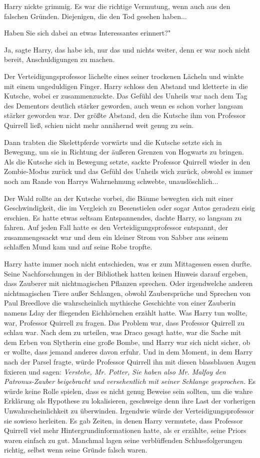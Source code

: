 Harry nickte grimmig. Es war die richtige Vermutung, wenn auch aus den falschen
Gründen. Diejenigen, die den Tod gesehen haben...

\glqq{}Haben Sie sich dabei an etwas Interessantes erinnert?"

\glqq{}Ja\grqq{}, sagte Harry, \glqq{}das habe ich\grqq{}, nur das und nichts
weiter, denn er war noch nicht bereit, Anschuldigungen zu machen.

Der Verteidigungsprofessor lächelte eines seiner trockenen Lächeln und winkte
mit einem ungeduldigen Finger. Harry schloss den Abstand und kletterte in die
Kutsche, wobei er zusammenzuckte. Das Gefühl des Unheils war nach dem Tag des
Dementors deutlich stärker geworden, auch wenn es schon vorher langsam stärker
geworden war. Der größte Abstand, den die Kutsche ihm von Professor Quirrell
ließ, schien nicht mehr annähernd weit genug zu sein.

Dann trabten die Skelettpferde vorwärts und die Kutsche setzte sich in Bewegung,
um sie in Richtung der äußeren Grenzen von Hogwarts zu bringen. Als die Kutsche
sich in Bewegung setzte, sackte Professor Quirrell wieder in den Zombie-Modus
zurück und das Gefühl des Unheils wich zurück, obwohl es immer noch am Rande von
Harrys Wahrnehmung schwebte, unauslöschlich...

Der Wald rollte an der Kutsche vorbei, die Bäume bewegten sich mit einer
Geschwindigkeit, die im Vergleich zu Besenstielen oder sogar Autos geradezu
eisig erschien. Es hatte etwas seltsam Entspannendes, dachte Harry, so langsam
zu fahren. Auf jeden Fall hatte es den Verteidigungsprofessor entspannt, der
zusammengesackt war und dem ein kleiner Strom von Sabber aus seinem schlaffen
Mund kam und auf seine Robe tropfte.

Harry hatte immer noch nicht entschieden, was er zum Mittagessen essen durfte.
Seine Nachforschungen in der Bibliothek hatten keinen Hinweis darauf ergeben,
dass Zauberer mit nichtmagischen Pflanzen sprechen. Oder irgendwelche anderen
nichtmagischen Tiere außer Schlangen, obwohl Zaubersprüche und Sprechen von Paul
Breedlove die wahrscheinlich mythische Geschichte von einer Zauberin namens Lday
der fliegenden Eichhörnchen erzählt hatte. Was Harry tun wollte, war, Professor
Quirrell zu fragen. Das Problem war, dass Professor Quirrell zu schlau war. Nach
dem zu urteilen, was Draco gesagt hatte, war die Sache mit dem Erben von
Slytherin eine große Bombe, und Harry war sich nicht sicher, ob er wollte, dass
jemand anderes davon erfuhr. Und in dem Moment, in dem Harry nach der Parsel
fragte, würde Professor Quirrell ihn mit diesen blassblauen Augen fixieren und
sagen:
\emph{Verstehe, Mr. Potter, Sie haben also Mr. Malfoy den Patronus-Zauber
beigebracht und versehentlich mit seiner Schlange gesprochen.}
Es würde keine Rolle spielen, dass es nicht genug Beweise sein sollten, um die
wahre Erklärung als Hypothese zu lokalisieren, geschweige denn ihre Last der
vorherigen Unwahrscheinlichkeit zu überwinden. Irgendwie würde der
Verteidigungsprofessor sie sowieso herleiten. Es gab Zeiten, in denen Harry
vermutete, dass Professor Quirrell viel mehr Hintergrundinformationen hatte, als
er erzählte, seine Priors waren einfach zu gut. Manchmal lagen seine
verblüffenden Schlussfolgerungen richtig, selbst wenn seine Gründe falsch waren.

